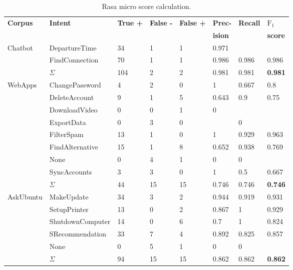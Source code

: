 \begin{table}[htbp]
    \centering
    \begin{tabular}{l l l l l l l l}
        \textbf{Corpus} & \textbf{Intent} & \textbf{True +} & \textbf{False -} & \textbf{False +} & \textbf{Prec-} & \textbf{Recall} & \textbf{$\text{F}_1$}\\
        & & & & & \textbf{ision} & & \textbf{score} \\
        \hline
        \multirow{3}{*}{Chatbot} & DepartureTime & 34 & 1 & 1 & 0.971 & &  \\
        & FindConnection & 70 & 1 & 1 & 0.986 & 0.986 & 0.986 \\
        & $\Sigma$ & 104 & 2 & 2 & 0.981 & 0.981 & \textbf{0.981} \\
        \hline
        \multirow{9}{*}{WebApps} & ChangePassword & 4 & 2 & 0 & 1 & 0.667 & 0.8 \\
        & DeleteAccount & 9 & 1 & 5 & 0.643 & 0.9 & 0.75 \\
        & DownloadVideo & 0 & 0 & 1 & 0 & &  \\
        & ExportData & 0 & 3 & 0 & & 0 &  \\
        & FilterSpam & 13 & 1 & 0 & 1 & 0.929 & 0.963 \\
        & FindAlternative & 15 & 1 & 8 & 0.652 & 0.938 & 0.769 \\
        & None & 0 & 4 & 1 & 0 & 0 &  \\
        & SyncAccounts & 3 & 3 & 0 & 1 & 0.5 & 0.667 \\
        & $\Sigma$ & 44 & 15 & 15 & 0.746 & 0.746 & \textbf{0.746} \\
        \hline
        \multirow{6}{*}{AskUbuntu} \hspace*{-3mm} & MakeUpdate & 34 & 3 & 2 & 0.944 & 0.919 & 0.931 \\
        & SetupPrinter & 13 & 0 & 2 & 0.867 & 1 & 0.929 \\
        & ShutdownComputer \hspace*{-3mm} & 14 & 0 & 6 & 0.7 & 1 & 0.824 \\
        & SRecommendation & 33 & 7 & 4 & 0.892 & 0.825 & 0.857\\
        & None & 0 & 5 & 1 & 0 & 0 \\
        & $\Sigma$ & 94 & 15 & 15 & 0.862 & 0.862 & \textbf{0.862}\\
        \hline
    \end{tabular}
    \caption{Rasa micro \fone score calculation.}
    \label{tab:recalculations_rasa}
\end{table}


